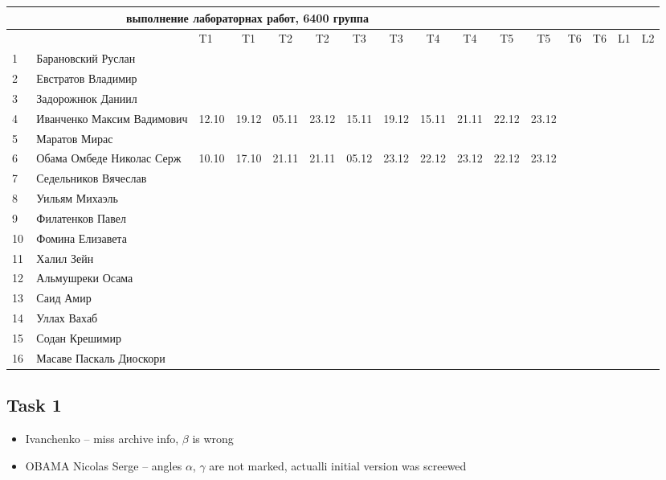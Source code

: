 \documentclass[a4paper,landscape,11pt]{article}
\begin{document}
\newpage
%
\hspace{-3.1cm} %
\begin{tabular}{l|llccc|cccc|cccccc}
\multicolumn{10}{c}{выполнение лабораторнах работ, 6400 группа} \\
\toprule
&&T1&T1& T2&T2& T3&T3& T4&T4&T5&T5&T6&T6&L1&L2\\
\midrule
1\,&  Барановский Руслан         &&&&&&&&\\
2\,&  Евстратов Владимир         &&&&&&&&\\
3\,&  Задорожнюк Даниил          &&&&&&&&\\
4\,&  Иванченко Максим Вадимович &12.10& 19.12& 05.11& 23.12& 15.11& 19.12& 15.11& 21.11& 22.12& 23.12\\
5\,&  Маратов Мирас              &&&&&&&&\\
\midrule
6\,&  Обама Омбеде Николас Серж  &10.10& 17.10& 21.11& 21.11& 05.12& 23.12& 22.12&23.12&22.12&23.12\\   %
7\,&  Седельников Вячеслав       &&&&&&&&\\
8\,&  Уильям Михаэль             &&&&&&&&\\   %
9\,&  Филатенков Павел           &&&&&&&&\\
10\,& Фомина Елизавета           &&&&&&&&\\
\midrule
11\,& Халил Зейн                 &&&&&&&&\\
12\,& Альмушреки Осама           &&&&&&&&\\   %
13\,& Саид Амир                  &&&&&&&&\\
14\,& Уллах Вахаб                &&&&&&&&\\
15\,& Содан Крешимир             &&&&&&&&\\
16\,& Масаве Паскаль Диоскори    &&&&&&&&\\
\bottomrule
\end{tabular}

\subsection{Task 1}
\begin{itemize}
\item Ivanchenko -- miss archive info, $\beta$ is wrong
\item OBAMA Nicolas Serge -- angles $\alpha$, $\gamma$ are not marked, actualli initial version was screewed
\end{itemize}
\end{document}

